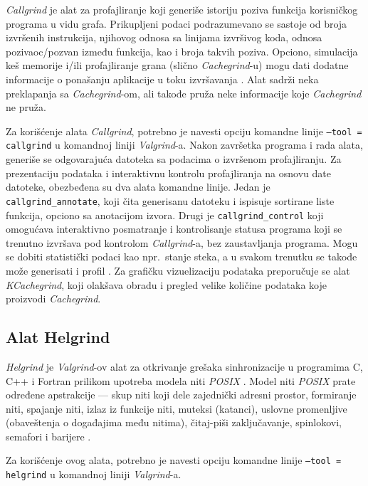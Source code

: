 \documentclass[12pt,oneside]{memoir}
\theoremstyle{plain}
\theoremstyle{definition}
\begin{document}
\textit{Callgrind} je alat za profajliranje koji generiše istoriju poziva funkcija korisničkog programa u vidu grafa. Prikupljeni podaci podrazumevano se sastoje od broja izvršenih instrukcija, njihovog odnosa sa linijama izvršivog koda, odnosa pozivaoc/pozvan između funkcija, kao i broja takvih poziva. Opciono, simulacija keš memorije i/ili profajliranje grana (slično \textit{Cachegrind}-u) mogu dati dodatne informacije o ponašanju aplikacije u toku izvršavanja \cite{Callgrind}. Alat sadrži neka preklapanja sa \textit{Cachegrind}-om, ali takođe pruža neke informacije koje \textit{Cachegrind} ne pruža.

Za korišćenje alata \textit{Callgrind}, potrebno je navesti opciju komandne linije \texttt{--tool = callgrind} u komandnoj liniji \textit{Valgrind}-a. Nakon završetka programa i rada alata, generiše se odgovarajuća datoteka sa podacima o izvršenom profajliranju. Za prezentaciju podataka i interaktivnu kontrolu profajliranja na osnovu date datoteke, obezbeđena su dva alata komandne linije. Jedan je \texttt{callgrind\_annotate}, koji čita generisanu datoteku i ispisuje sortirane liste funkcija, opciono sa anotacijom izvora. Drugi je \texttt{callgrind\_control} koji omogućava interaktivno posmatranje i kontrolisanje statusa programa koji se trenutno izvršava pod kontrolom \textit{Callgrind}-a, bez zaustavljanja programa. Mogu se dobiti statistički podaci kao npr.~stanje steka, a u svakom trenutku se takođe može generisati i profil \cite{Callgrind}. Za grafičku vizuelizaciju podataka preporučuje se alat \textit{KCachegrind}, koji olakšava obradu i pregled velike količine podataka koje proizvodi \textit{Cachegrind}.

\subsection{Alat Helgrind}

\textit{Helgrind} je \textit{Valgrind}-ov alat za otkrivanje grešaka sinhronizacije u programima C, C++ i Fortran prilikom upotreba modela niti \textit{POSIX} \cite{Helgrind}. Model niti \textit{POSIX} prate određene apstrakcije --- skup niti koji dele zajednički adresni prostor, formiranje niti, spajanje niti, izlaz iz funkcije niti, muteksi (katanci), uslovne promenljive (obaveštenja o događajima među nitima), čitaj-piši zaključavanje, spinlokovi, semafori i barijere \cite{Helgrind}. 

Za korišćenje ovog alata, potrebno je navesti opciju komandne linije \texttt{--tool = helgrind} u komandnoj liniji \textit{Valgrind}-a.
\end{document}
